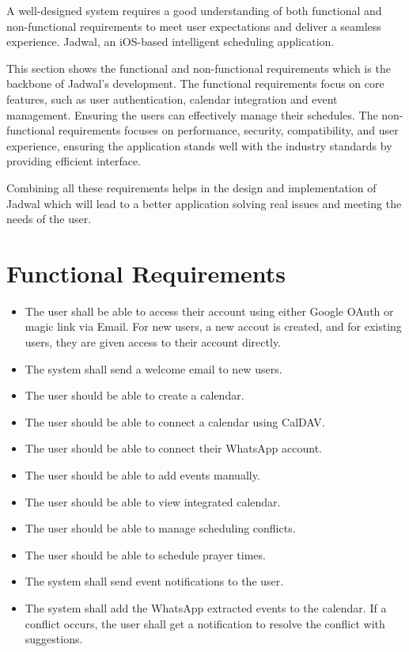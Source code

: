 \documentclass[12pt,a4paper]{report}
\begin{document}
A well-designed system requires a good understanding of both functional and non-functional requirements to meet user expectations and deliver a seamless experience. Jadwal, an iOS-based intelligent scheduling application. 

This section shows the functional and non-functional requirements which is the backbone of Jadwal's development. The functional requirements focus on core features, such as user authentication, calendar integration and event management. Ensuring the users can effectively manage their schedules. The non-functional requirements focuses on performance, security, compatibility, and user experience, ensuring the application stands well with the industry standards by providing efficient interface.

Combining all these requirements helps in the design and implementation of Jadwal which will lead to a better application solving real issues and meeting the needs of the user.


\section{Functional Requirements}

\begin{itemize}
    \item The user shall be able to access their account using either Google OAuth or magic link via Email. For new users, a new accout is created, and for existing users, they are given access to their account directly.
    \item The system shall send a welcome email to new users.
    \item The user should be able to create a calendar.
    \item The user should be able to connect a calendar using CalDAV.
    \item The user should be able to connect their WhatsApp account.
    \item The user should be able to add events manually.
    \item The user should be able to view integrated calendar.
    \item The user should be able to manage scheduling conflicts.
    \item The user should be able to schedule prayer times.
    \item The system shall send event notifications to the user.
    \item The system shall add the WhatsApp extracted events to the calendar. If a conflict occurs, the user shall get a notification to resolve the conflict with suggestions.
\end{itemize}
\end{document}
